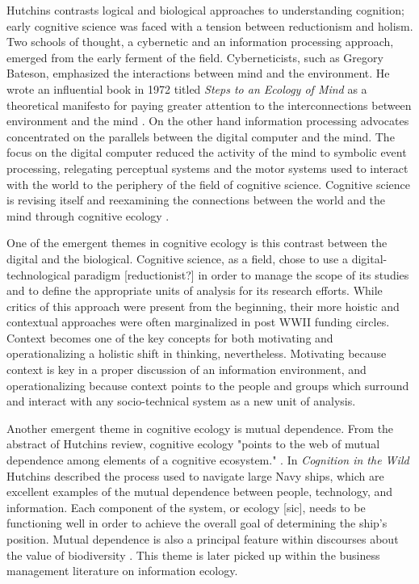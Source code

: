 Hutchins contrasts logical and biological approaches to understanding cognition; early cognitive science was faced with a tension between reductionism and holism. Two schools of thought, a cybernetic and an information processing approach, emerged from the early ferment of the field. Cyberneticists, such as Gregory Bateson, emphasized the interactions between mind and the environment. He wrote an influential book in 1972 titled \textit{Steps to an Ecology of Mind} as a theoretical manifesto for paying greater attention to the interconnections between environment and the mind \citep{bateson_1972}. On the other hand information processing advocates concentrated on the parallels between the digital computer and the mind. The focus on the digital computer reduced the activity of the mind to symbolic event processing, relegating perceptual systems and the motor systems used to interact with the world to the periphery of the field of cognitive science. Cognitive science is revising itself and reexamining the connections between the world and the mind through cognitive ecology \citep{hutchins_cognitive_2010}.

One of the emergent themes in cognitive ecology is this contrast between the digital and the biological. Cognitive science, as a field, chose to use a digital-technological paradigm [reductionist?] in order to manage the scope of its studies and to define the appropriate units of analysis for its research efforts. While critics of this approach were present from the beginning, their more hoistic and contextual approaches were often marginalized in post WWII funding circles. Context becomes one of the key concepts for both motivating and operationalizing a holistic shift in thinking, nevertheless. Motivating because context is key in a proper discussion of an information environment, and operationalizing because context points to the people and groups which surround and interact with any socio-technical system as a new unit of analysis.

Another emergent theme in cognitive ecology is mutual dependence. From the abstract of Hutchins review, cognitive ecology "points to the web of mutual dependence among elements of a cognitive ecosystem." \citep{hutchins_cognitive_2010}. In \textit{Cognition in the Wild} Hutchins described the process used to navigate large Navy ships, which are excellent examples of the mutual dependence between people, technology, and information. Each component of the system, or ecology [sic], needs to be functioning well in order to achieve the overall goal of determining the ship's position. Mutual dependence is also a principal feature within discourses about the value of biodiversity \citep{hutchins_1995}. This theme is later picked up within the business management literature on information ecology.

